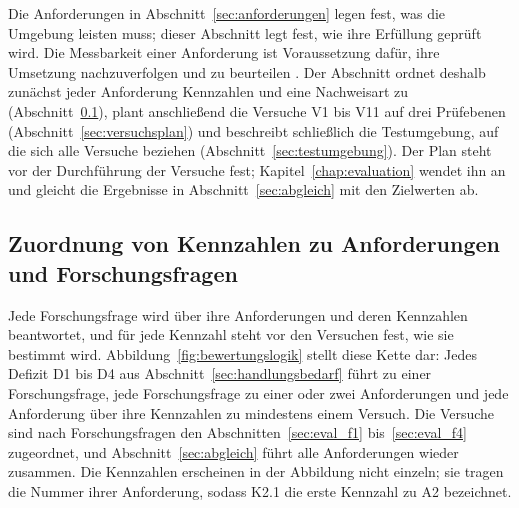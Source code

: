 
Die Anforderungen in Abschnitt~\ref{sec:anforderungen} legen fest, was die Umgebung leisten muss; dieser Abschnitt legt fest, wie ihre Erfüllung geprüft wird.
Die Messbarkeit einer Anforderung ist Voraussetzung dafür, ihre Umsetzung nachzuverfolgen und zu beurteilen \cite{Bender2021}.
Der Abschnitt ordnet deshalb zunächst jeder Anforderung Kennzahlen und eine Nachweisart zu (Abschnitt~\ref{sec:kennzahlen}), plant anschließend die Versuche V1 bis V11 auf drei Prüfebenen (Abschnitt~\ref{sec:versuchsplan}) und beschreibt schließlich die Testumgebung, auf die sich alle Versuche beziehen (Abschnitt~\ref{sec:testumgebung}).
Der Plan steht vor der Durchführung der Versuche fest; Kapitel~\ref{chap:evaluation} wendet ihn an und gleicht die Ergebnisse in Abschnitt~\ref{sec:abgleich} mit den Zielwerten ab.

\subsection{Zuordnung von Kennzahlen zu Anforderungen und Forschungsfragen}
\label{sec:kennzahlen}
Jede Forschungsfrage wird über ihre Anforderungen und deren Kennzahlen beantwortet, und für jede Kennzahl steht vor den Versuchen fest, wie sie bestimmt wird.
Abbildung~\ref{fig:bewertungslogik} stellt diese Kette dar: Jedes Defizit D1 bis D4 aus Abschnitt~\ref{sec:handlungsbedarf} führt zu einer Forschungsfrage, jede Forschungsfrage zu einer oder zwei Anforderungen und jede Anforderung über ihre Kennzahlen zu mindestens einem Versuch.
Die Versuche sind nach Forschungsfragen den Abschnitten~\ref{sec:eval_f1} bis~\ref{sec:eval_f4} zugeordnet, und Abschnitt~\ref{sec:abgleich} führt alle Anforderungen wieder zusammen.
Die Kennzahlen erscheinen in der Abbildung nicht einzeln; sie tragen die Nummer ihrer Anforderung, sodass K2.1 die erste Kennzahl zu A2 bezeichnet.

